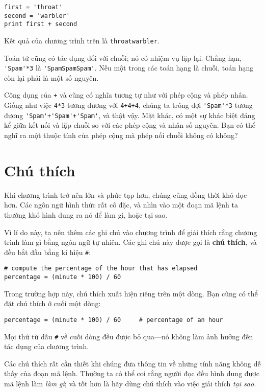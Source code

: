 \documentclass[11pt]{book}
\begin{document}

\beforeverb
\begin{verbatim}
first = 'throat'
second = 'warbler'
print first + second
\end{verbatim}
\afterverb
%
Kết quả của chương trình trên là {\tt throatwarbler}.

Toán tử {\tt *} cũng có tác dụng đối với chuỗi; nó có nhiệm
vụ lặp lại. Chẳng hạn, \verb"'Spam'*3" là \verb"'SpamSpamSpam'".
Nếu một trong các toán hạng là chuỗi, toán hạng còn lại
phải là một số nguyên.

Công dụng của {\tt +} và {\tt *} cũng có nghĩa tương tự
như với phép cộng và phép nhân. Giống như việc {\tt 4*3}
tương đương với {\tt 4+4+4}, chúng ta trông đợi
 \verb"'Spam'*3" tương đương \verb"'Spam'+'Spam'+'Spam'",
và thật vậy. Mặt khác, có một sự khác biệt đáng kể giữa
kết nối và lặp chuỗi so với các phép cộng và nhân số nguyên.
Bạn có thể nghĩ ra một thuộc tính của phép cộng mà phép nối
chuỗi không có không?



\section{Chú thích}

Khi chương trình trở nên lớn và phức tạp hơn, chúng cũng đồng thời khó đọc
hơn. Các ngôn ngữ hình thức rất cô đặc, và nhìn vào một đoạn mã lệnh
ta thường khó hình dung ra nó để làm gì, hoặc tại sao.

Vì lí do này, ta nên thêm các ghi chú vào chương trình để giải thích
rằng chương trình làm gì bằng ngôn ngữ tự nhiên. Các ghi chú này được
gọi là {\bf chú thích}, và đều bắt đầu bằng kí hiệu \verb"#":

\beforeverb
\begin{verbatim}
# compute the percentage of the hour that has elapsed
percentage = (minute * 100) / 60
\end{verbatim}
\afterverb
%
Trong trường hợp này, chú thích xuất hiện riêng trên một dòng. Bạn cũng
có thể đặt chú thích ở cuối một dòng:

\beforeverb
\begin{verbatim}
percentage = (minute * 100) / 60     # percentage of an hour
\end{verbatim}
\afterverb
%
Mọi thứ từ dấu {\tt \#} về cuối dòng đều được bỏ qua---nó không làm
ảnh hưởng đến tác dụng của chương trình.

Các chú thích rất cần thiết khi chúng đưa thông tin về những tính năng
không dễ thấy của đoạn mã lệnh. Thường ta có thể coi rằng người đọc
đều hình dung được mã lệnh làm {\em làm gì}; và tốt hơn là hãy dùng 
chú thích vào việc giải thích {\em tại sao}.
\end{document}
